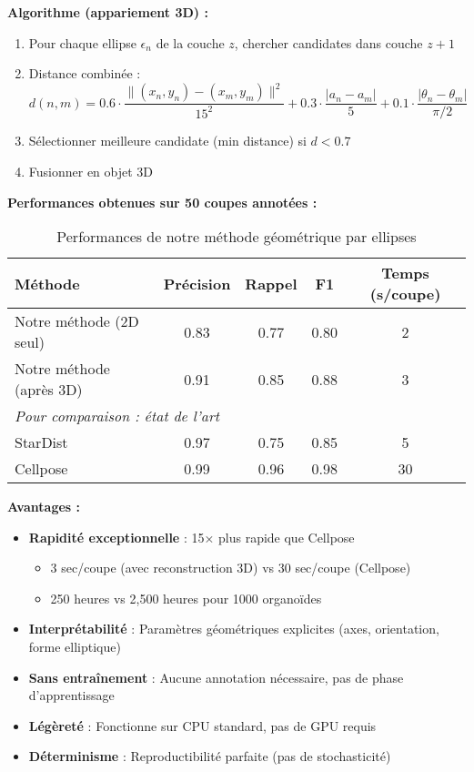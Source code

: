 \textbf{Algorithme (appariement 3D) :}
\begin{enumerate}
    \item Pour chaque ellipse $\epsilon_n$ de la couche $z$, chercher candidates dans couche $z+1$
    \item Distance combinée :
        \[
        d(n, m) = 0.6 \cdot \frac{\|(x_n, y_n) - (x_m, y_m)\|^2}{15^2} + 0.3 \cdot \frac{|a_n - a_m|}{5} + 0.1 \cdot \frac{|\theta_n - \theta_m|}{\pi/2}
        \]
    \item Sélectionner meilleure candidate (min distance) si $d < 0.7$
    \item Fusionner en objet 3D
\end{enumerate}

\textbf{Performances obtenues sur 50 coupes annotées :}
\begin{table}[h]
\centering
\caption{Performances de notre méthode géométrique par ellipses}
\begin{tabular}{lcccc}
\toprule
\textbf{Méthode} & \textbf{Précision} & \textbf{Rappel} & \textbf{F1} & \textbf{Temps (s/coupe)} \\
\midrule
Notre méthode (2D seul) & 0.83 & 0.77 & 0.80 & 2 \\
Notre méthode (après 3D) & 0.91 & 0.85 & 0.88 & 3 \\
\midrule
\multicolumn{5}{l}{\textit{Pour comparaison : état de l'art}} \\
StarDist & 0.97 & 0.75 & 0.85 & 5 \\
Cellpose & 0.99 & 0.96 & 0.98 & 30 \\
\bottomrule
\end{tabular}
\end{table}

\textbf{Avantages :}
\begin{itemize}
    \item \textbf{Rapidité exceptionnelle} : 15× plus rapide que Cellpose
    \begin{itemize}
        \item 3 sec/coupe (avec reconstruction 3D) vs 30 sec/coupe (Cellpose)
        \item 250 heures vs 2,500 heures pour 1000 organoïdes
    \end{itemize}
    \item \textbf{Interprétabilité} : Paramètres géométriques explicites (axes, orientation, forme elliptique)
    \item \textbf{Sans entraînement} : Aucune annotation nécessaire, pas de phase d'apprentissage
    \item \textbf{Légèreté} : Fonctionne sur CPU standard, pas de GPU requis
    \item \textbf{Déterminisme} : Reproductibilité parfaite (pas de stochasticité)
\end{itemize}

